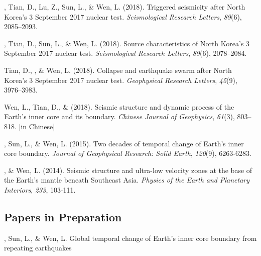 \begin{etaremune}
\item
    \Yao, Tian, D., Lu, Z., Sun, L., \& Wen, L. (2018).
    Triggered seismicity after North Korea's 3 September 2017 nuclear test.
    \textit{Seismological Research Letters}, \textit{89}(6), 2085--2093.
\item
    \Yao, Tian, D., Sun, L., \& Wen, L. (2018).
	Source characteristics of North Korea's 3 September 2017 nuclear test.
    \textit{Seismological Research Letters}, \textit{89}(6), 2078--2084.
\item
    Tian, D., \Yao\CF, \& Wen, L. (2018).
    Collapse and earthquake swarm after North Korea's 3 September 2017 nuclear test.
    \textit{Geophysical Research Letters}, \textit{45}(9), 3976--3983.
\item
    Wen, L., Tian, D., \& \Yao (2018).
    Seismic structure and dynamic process of the Earth's inner core and its boundary.
    \textit{Chinese Journal of Geophysics}, \textit{61}(3), 803--818.
     [in Chinese]
\item
    \Yao, Sun, L., \& Wen, L. (2015).
    Two decades of temporal change of Earth's inner core boundary.
    \textit{Journal of Geophysical Research: Solid Earth}, \textit{120}(9), 6263-6283.
\item
    \Yao, \& Wen, L. (2014).
    Seismic structure and ultra-low velocity zones at the base of the Earth's mantle beneath Southeast Asia.
    \textit{Physics of the Earth and Planetary Interiors}, \textit{233}, 103-111.
\end{etaremune}


\subsection*{Papers in Preparation}
\begin{etaremune}
\item
    \Yao, Sun, L., \& Wen, L.
    Global temporal change of Earth's inner core boundary from repeating earthquakes
\end{etaremune}
